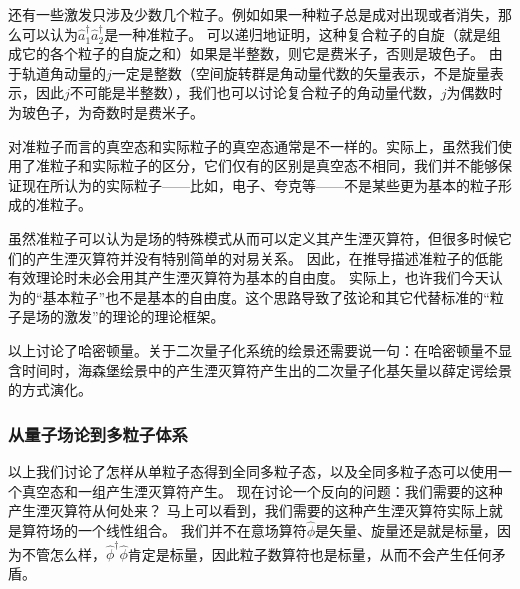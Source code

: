\documentclass[UTF8, a4paper]{ctexart}
\begin{document}
还有一些激发只涉及少数几个粒子。例如如果一种粒子总是成对出现或者消失，那么可以认为$\hat{a}^\dagger_1 \hat{a}^\dagger_2$是一种准粒子。
可以递归地证明，这种复合粒子的自旋（就是组成它的各个粒子的自旋之和）如果是半整数，则它是费米子，否则是玻色子。
由于轨道角动量的$j$一定是整数（空间旋转群是角动量代数的矢量表示，不是旋量表示，因此$j$不可能是半整数），我们也可以讨论复合粒子的角动量代数，$j$为偶数时为玻色子，为奇数时是费米子。

对准粒子而言的真空态和实际粒子的真空态通常是不一样的。实际上，虽然我们使用了准粒子和实际粒子的区分，它们仅有的区别是真空态不相同，我们并不能够保证现在所认为的实际粒子——比如，电子、夸克等——不是某些更为基本的粒子形成的准粒子。

虽然准粒子可以认为是场的特殊模式从而可以定义其产生湮灭算符，但很多时候它们的产生湮灭算符并没有特别简单的对易关系。
因此，在推导描述准粒子的低能有效理论时未必会用其产生湮灭算符为基本的自由度。
实际上，也许我们今天认为的“基本粒子”也不是基本的自由度。这个思路导致了弦论和其它代替标准的“粒子是场的激发”的理论的理论框架。

以上讨论了哈密顿量。关于二次量子化系统的绘景还需要说一句：在哈密顿量不显含时间时，海森堡绘景中的产生湮灭算符产生出的二次量子化基矢量以薛定谔绘景的方式演化。

\subsubsection{从量子场论到多粒子体系}\label{sec:from-qft-to-many-body}

以上我们讨论了怎样从单粒子态得到全同多粒子态，以及全同多粒子态可以使用一个真空态和一组产生湮灭算符产生。
现在讨论一个反向的问题：我们需要的这种产生湮灭算符从何处来？
马上可以看到，我们需要的这种产生湮灭算符实际上就是算符场的一个线性组合。
我们并不在意场算符$\hat{\phi}$是矢量、旋量还是就是标量，因为不管怎么样，$\hat{\phi}^\dagger \hat{\phi}$肯定是标量，因此粒子数算符也是标量，从而不会产生任何矛盾。
\end{document}

